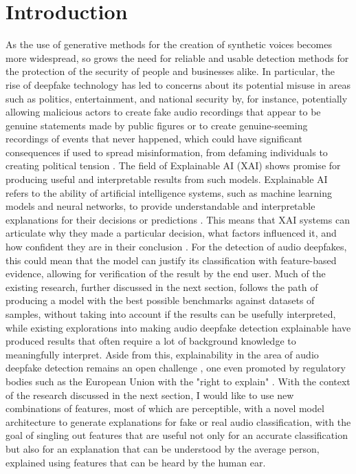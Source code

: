 \documentclass{article}
\begin{document}
    \section{Introduction}
    As the use of generative methods for the creation of synthetic voices becomes more widespread,
    so grows the need for reliable and usable detection methods for the protection of the security
    of people and businesses alike. In particular, the rise of deepfake technology has led to
	concerns about its potential misuse in areas such as politics, entertainment, and national
	security by, for instance, potentially allowing malicious actors to create fake audio
	recordings that appear to be genuine statements made by public figures or to create
	genuine-seeming recordings of events that never happened, which could have significant
	consequences if used to spread misinformation, from defaming individuals to creating political
	tension \cite{veerasamy_rising_2022,albahar_deepfakes_2005}. The field of Explainable AI (XAI)
	shows promise for producing useful and interpretable results from such models. Explainable AI
	refers to the ability of artificial intelligence systems, such as machine learning models and
	neural networks, to provide understandable and interpretable explanations for their decisions
	or predictions \cite{hind_explaining_2019}. This means that XAI systems can articulate why
	they made a particular decision, what factors influenced it, and how confident they are in
	their conclusion \cite{hind_explaining_2019}. For the detection of audio deepfakes, this could
	mean that the model can justify its classification with feature-based evidence, allowing for
	verification of the result by the end user. Much of the existing research, further discussed
	in the next section, follows the path of producing a model with the best possible benchmarks
	against datasets of samples, without taking into account if the results can be usefully
	interpreted, while existing explorations into making audio deepfake detection explainable have
	produced results that often require a lot of background knowledge to meaningfully interpret.
	Aside from this, explainability in the area of audio deepfake detection remains an open
	challenge \cite{cuccovillo_open_2022}, one even promoted by regulatory bodies such as the
	European Union with the "right to explain" \cite{goodman_european_2017}. With the context of
	the research discussed in the next section, I would like to use new combinations of features,
	most of which are perceptible, with a novel model architecture to generate explanations for
	fake or real audio classification, with the goal of singling out features that are useful not
	only for an accurate classification but also for an explanation that can be understood by the
	average person, explained using features that can be heard by the human ear.
\end{document}
